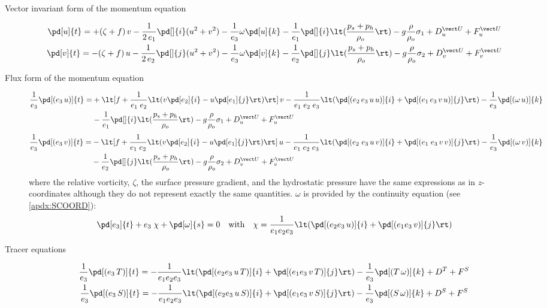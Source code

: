 \documentclass[../main/NEMO_manual]{subfiles}
\begin{document}
\begin{description}
\item [Vector invariant form of the momentum equation]
  \begin{gather*}
    \pd[u]{t} = + (\zeta + f) \, v - \frac{1}{2 \, e_1} \pd[]{i} (u^2 + v^2) - \frac{1}{e_3} \omega \pd[u]{k} - \frac{1}{e_1} \pd[]{i} \lt( \frac{p_s + p_h}{\rho_o} \rt) - g \frac{\rho}{\rho_o} \sigma_1 + D_u^{\vect U} + F_u^{\vect U} \\
    \pd[v]{t} = - (\zeta + f) \, u - \frac{1}{2 \, e_2} \pd[]{j} (u^2 + v^2) - \frac{1}{e_3} \omega \pd[v]{k} - \frac{1}{e_2} \pd[]{j} \lt( \frac{p_s + p_h}{\rho_o} \rt) - g \frac{\rho}{\rho_o} \sigma_2 + D_v^{\vect U} + F_v^{\vect U}
  \end{gather*}
\item [Flux form of the momentum equation]
  \begin{alignat*}{2}
    \frac{1}{e_3} \pd[(e_3 \, u)]{t} = &+ \lt[ f + \frac{1}{e_1 \; e_2} \lt( v \pd[e_2]{i} - u \pd[e_1]{j} \rt) \rt] \, v - \frac{1}{e_1 \; e_2 \; e_3} \lt( \pd[(e_2 \, e_3 \, u \, u)]{i} + \pd[(e_1 \, e_3 \, v \, u)]{j} \rt) - \frac{1}{e_3} \pd[(\omega \, u)]{k} \\
    &- \frac{1}{e_1} \pd[]{i} \lt( \frac{p_s + p_h}{\rho_o} \rt) - g \frac{\rho}{\rho_o} \sigma_1 + D_u^{\vect U} + F_u^{\vect U}
  \end{alignat*}
  \begin{alignat*}{2}
    \frac{1}{e_3} \pd[(e_3 \, v)]{t} = &- \lt[ f + \frac{1}{e_1 \; e_2} \lt( v \pd[e_2]{i} - u \pd[e_1]{j} \rt) \rt] \, u - \frac{1}{e_1 \; e_2 \; e_3} \lt( \pd[( e_2 \; e_3 \, u \, v)]{i} + \pd[(e_1 \; e_3 \, v \, v)]{j} \rt) - \frac{1}{e_3} \pd[(\omega \, v)]{k} \\
    &- \frac{1}{e_2} \pd[]{j} \lt( \frac{p_s + p_h}{\rho_o} \rt) - g \frac{\rho}{\rho_o}\sigma_2 + D_v^{\vect U} + F_v^{\vect U}
  \end{alignat*}
  where the relative vorticity, $\zeta$, the surface pressure gradient,
  and the hydrostatic pressure have the same expressions as in $z$-coordinates although
  they do not represent exactly the same quantities.
  $\omega$ is provided by the continuity equation (see \autoref{apdx:SCOORD}):
  \[
    \pd[e_3]{t} + e_3 \; \chi + \pd[\omega]{s} = 0 \quad \text{with} \quad
    \chi = \frac{1}{e_1 e_2 e_3} \lt( \pd[(e_2 e_3 \, u)]{i} + \pd[(e_1 e_3 \, v)]{j} \rt)
  \]
\item [Tracer equations]
  \begin{gather*}
    \frac{1}{e_3} \pd[(e_3 \, T)]{t} = - \frac{1}{e_1 e_2 e_3} \lt(   \pd[(e_2 e_3 \, u \, T)]{i} + \pd[(e_1 e_3 \, v \, T)]{j} \rt) - \frac{1}{e_3} \pd[(T \, \omega)]{k} + D^T + F^S \\
    \frac{1}{e_3} \pd[(e_3 \, S)]{t} = - \frac{1}{e_1 e_2 e_3} \lt(   \pd[(e_2 e_3 \, u \, S)]{i} + \pd[(e_1 e_3 \, v \, S)]{j} \rt) - \frac{1}{e_3} \pd[(S \, \omega)]{k} + D^S + F^S
  \end{gather*}
\end{description}
\end{document}
